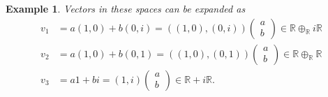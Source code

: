 \documentclass[aps,preprint]{revtex4}
\newtheorem{example}[theorem]{Example}
\begin{document}
\begin{example}
Vectors in these spaces can be expanded as 
\begin{align}
v_{1}& =a\left( 1,0\right) +b\left( 0,i\right) =\left( \left( 1,0\right)
,\left( 0,i\right) \right) \left( 
\begin{array}{c}
a \\ 
b%
\end{array}%
\right) \in \mathbb{R}\oplus _{\mathbb{R}}i\mathbb{R} \\
v_{2}& =a\left( 1,0\right) +b\left( 0,1\right) =\left( \left( 1,0\right)
,\left( 0,1\right) \right) \left( 
\begin{array}{c}
a \\ 
b%
\end{array}%
\right) \in \mathbb{R\oplus _{\mathbb{R}}R} \\
v_{3}& =a1+bi=\left( 1,i\right) \left( 
\begin{array}{c}
a \\ 
b%
\end{array}%
\right) \in \mathbb{R}+i\mathbb{R}.
\end{align}


\end{example}
\end{document}
